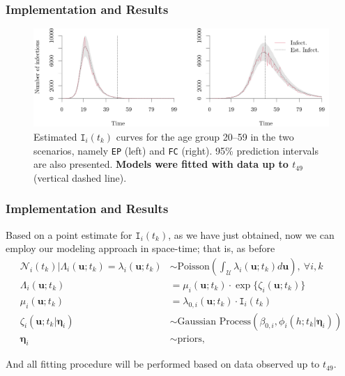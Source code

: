 \documentclass[12pt, aspectratio = 169]{beamer} %
\begin{document}
	\begin{frame}[t]
		\frametitle{Implementation and Results}
		\justifying
		\begin{figure}[!ht]
			\centering
			\includegraphics[width = 1\textwidth]{Images/estimated_SIR_curves_one.png}
			\caption{\justifying Estimated $\texttt{I}_i(t_k)$ curves for the age group 20--59 in the two scenarios, namely \texttt{EP} (left) and \texttt{FC} (right). 95\% prediction intervals are also presented. \textbf{Models were fitted with data up to $t_{49}$} (vertical dashed line).}
			\label{fig:estimatedSIRonegroup}
		\end{figure}
		
	\end{frame}
	
	\begin{frame}[t]
		\frametitle{Implementation and Results}
		\justifying
		
		Based on a point estimate for $\texttt{I}_i(t_k)$, as we have just obtained, now we can employ our modeling approach in space-time; that is, as before
		\begin{align*}
			\mathcal{N}_i(t_k)|\Lambda_i(\mathbf{u}; t_k) = \lambda_i(\mathbf{u}; t_k) &\sim \text{Poisson}\left(\int_{\mathcal{U}}\lambda_i(\mathbf{u}; t_k)d\mathbf{u}\right), ~\forall i, k \\
			\Lambda_i(\mathbf{u}; t_k) &= \mu_i(\mathbf{u}; t_k) \cdot \exp\{\zeta_i({\mathbf{u}; t_k})\} \nonumber \\
			\mu_i(\mathbf{u}; t_k) &= \lambda_{0, i}(\mathbf{u}; t_k) \cdot \texttt{I}_i(t_k) \nonumber \\ 
			\zeta_i(\mathbf{u}; t_k | \boldsymbol{\eta}_i) &\sim \text{Gaussian Process} (\beta_{0, i}, \phi_i(h; t_k | \boldsymbol{\eta}_i)) \nonumber \\
			\boldsymbol{\eta}_i &\sim \text{priors}, \nonumber
		\end{align*}
		
		
		
		And all fitting procedure will be performed based on data observed up to $t_{49}$.
		
	\end{frame}
\end{document}
